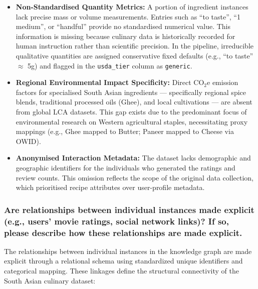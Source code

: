 \documentclass{article}
\newcommand{\question}[1]{#1}
\begin{document}
\begin{itemize}
    \item \textbf{Non-Standardised Quantity Metrics:} A portion of ingredient instances lack precise mass or volume measurements. Entries such as ``to taste'', ``1 medium'', or ``handful'' provide no standardised numerical value. This information is missing because culinary data is historically recorded for human instruction rather than scientific precision. In the pipeline, irreducible qualitative quantities are assigned conservative fixed defaults (e.g., ``to taste'' $\approx$ 5g) and flagged in the \texttt{usda\_tier} column as \texttt{generic}.
    \item \textbf{Regional Environmental Impact Specificity:} Direct CO$_2$e emission factors for specialised South Asian ingredients --- specifically regional spice blends, traditional processed oils (Ghee), and local cultivations --- are absent from global LCA datasets. This gap exists due to the predominant focus of environmental research on Western agricultural staples, necessitating proxy mappings (e.g., Ghee mapped to Butter; Paneer mapped to Cheese via OWID).
    \item \textbf{Anonymised Interaction Metadata:} The dataset lacks demographic and geographic identifiers for the individuals who generated the ratings and review counts. This omission reflects the scope of the original data collection, which prioritised recipe attributes over user-profile metadata.
\end{itemize}


\question{\subsubsection*{Are relationships between individual instances made explicit (e.g.,
users’ movie ratings, social network links)? If so, please describe
how these relationships are made explicit.}}


The relationships between individual instances in the knowledge graph are made explicit through a relational schema using standardized unique identifiers and categorical mapping. These linkages define the structural connectivity of the South Asian culinary dataset:
\end{document}

